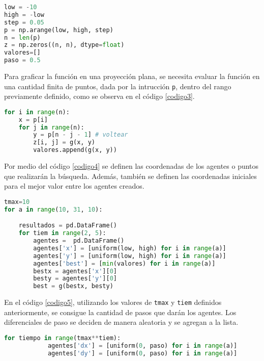 \documentclass{article}
\begin{document}
\begin{lstlisting}[caption=Par\'ametros de Evaluaci\'on, label=codigo2, language=Python]
low = -10
high = -low
step = 0.05
p = np.arange(low, high, step)
n = len(p)
z = np.zeros((n, n), dtype=float)
valores=[]
paso = 0.5
\end{lstlisting}

Para graficar la funci\'on en una proyecci\'on plana, se necesita evaluar la funci\'on en una cantidad finita de puntos, dada por la intrucci\'on \texttt{p}, dentro del rango previamente definido, como se observa en el c\'odigo \ref{codigo3}.

\begin{lstlisting}[caption= Puntos para Graficar la Funci\'on, label=codigo3, language=Python]
for i in range(n):
    x = p[i]
    for j in range(n): 
        y = p[n - j - 1] # voltear
        z[i, j] = g(x, y)
        valores.append(g(x, y))
\end{lstlisting}

Por medio del c\'odigo \ref{codigo4} se definen las coordenadas de los agentes o puntos que realizar\'an la b\'usqueda. Adem\'as, tambi\'en se definen las coordenadas iniciales para el mejor valor entre los agentes creados.

\begin{lstlisting}[caption= Creaci\'on de Coordenadas para B\'usqueda, label=codigo4, language=Python]
tmax=10
for a in range(10, 31, 10):

    resultados = pd.DataFrame()
    for tiem in range(2, 5):
        agentes =  pd.DataFrame()
        agentes['x'] = [uniform(low, high) for i in range(a)]
        agentes['y'] = [uniform(low, high) for i in range(a)]
        agentes['best'] = [min(valores) for i in range(a)]
        bestx = agentes['x'][0]
        besty = agentes['y'][0]
        best = g(bestx, besty)
\end{lstlisting}

En el c\'odigo \ref{codigo5}, utilizando los valores de \texttt{tmax} y \texttt{tiem} definidos anteriormente, se consigue la cantidad de pasos que dar\'an los agentes. Los diferenciales de paso se deciden de manera aleatoria y se agregan a la lista.

\begin{lstlisting}[caption= Diferenciales de Paso, label=codigo5, language=Python]
        for tiempo in range(tmax**tiem):
            agentes['dx'] = [uniform(0, paso) for i in range(a)]
            agentes['dy'] = [uniform(0, paso) for i in range(a)]
\end{lstlisting}
\end{document}
